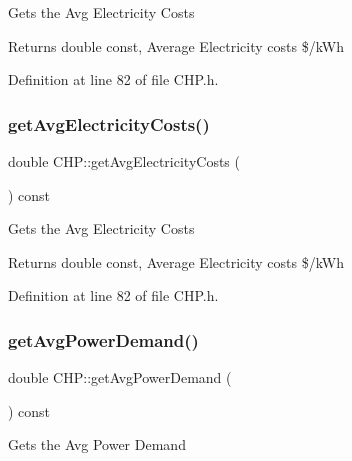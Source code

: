 Gets the Avg Electricity Costs

\begin{DoxyReturn}{Returns}
double const, Average Electricity costs \$/k\+Wh 
\end{DoxyReturn}


Definition at line 82 of file C\+H\+P.\+h.

\mbox{\label{class_c_h_p_a2bc5ac0eb3d7ce42f77f26b3973f6c9f}} 
\subsubsection{\texorpdfstring{get\+Avg\+Electricity\+Costs()}{getAvgElectricityCosts()}\hspace{0.1cm}{\footnotesize\ttfamily [3/3]}}
{\footnotesize\ttfamily double C\+H\+P\+::get\+Avg\+Electricity\+Costs (\begin{DoxyParamCaption}{ }\end{DoxyParamCaption}) const\hspace{0.3cm}{\ttfamily [inline]}}

Gets the Avg Electricity Costs

\begin{DoxyReturn}{Returns}
double const, Average Electricity costs \$/k\+Wh 
\end{DoxyReturn}


Definition at line 82 of file C\+H\+P.\+h.

\mbox{\label{class_c_h_p_a79f9a97a010669c5ffed9339c54a36c6}} 
\subsubsection{\texorpdfstring{get\+Avg\+Power\+Demand()}{getAvgPowerDemand()}\hspace{0.1cm}{\footnotesize\ttfamily [1/3]}}
{\footnotesize\ttfamily double C\+H\+P\+::get\+Avg\+Power\+Demand (\begin{DoxyParamCaption}{ }\end{DoxyParamCaption}) const\hspace{0.3cm}{\ttfamily [inline]}}

Gets the Avg Power Demand

